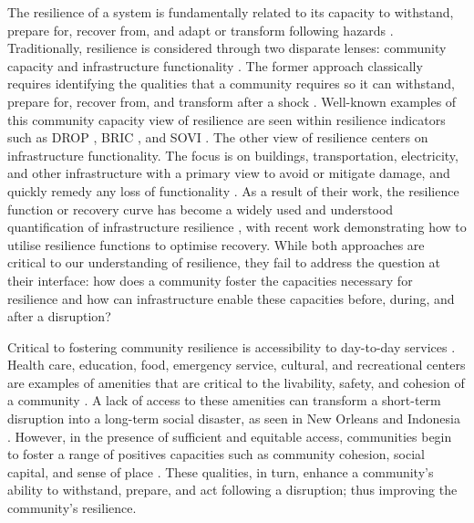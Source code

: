 \documentclass[review,3p,times,onecolumn,sort&compress,12pt]{elsarticle}
\let \cite \parencite
\begin{document}
The resilience of a system is fundamentally related to its capacity to withstand, prepare for, recover from, and adapt or transform following hazards \cite{Bene2012-mx, Meerow2016-definingRes, GillespieMarthaler2019-ak,Cutter2016-xv}.
Traditionally, resilience is considered through two disparate lenses: community capacity \cite{Cutter2014-lr, Zautra2008-nc} and infrastructure functionality \cite{lin2018empirical, Cutter2014-lr}.
The former approach classically requires identifying the qualities that a community requires so it can withstand, prepare for, recover from, and transform after a shock \cite{Cutter2010-ee, Cutter2016-xv, Cutter2014-lr, Sherrieb2010-lk}.
Well-known examples of this community capacity view of resilience are seen within resilience indicators such as DROP \cite{Cutter2008-if}, BRIC \cite{Cutter2014-lr}, and SOVI \cite{Cutter2003-xi}.
The other view of resilience centers on infrastructure functionality.
The focus is on buildings, transportation, electricity, and other infrastructure with a primary view to avoid or mitigate damage, and quickly remedy any loss of functionality \cite{Bruneau2003-lk, Barker2013-uf, Curt2018-mm, Guidotti2016-hc, Hosseini2016-ae, Haimes2009-oi}.
As a result of their work, the resilience function or recovery curve has become a widely used and understood quantification of infrastructure resilience \cite{Bruneau2006-jg, Sharma2018-uh}, with recent work demonstrating how to utilise resilience functions to optimise recovery.
While both approaches are critical to our understanding of resilience, they fail to address the question at their interface: 
how does a community foster the capacities necessary for resilience and how can infrastructure enable these capacities before, during, and after a disruption?

Critical to fostering community resilience is accessibility to day-to-day services \cite{logan2020reframing}.
Health care, education, food, emergency service, cultural, and recreational centers are examples of amenities that are critical to the livability, safety, and cohesion of a community \cite{Contreras2017-wn, Dempsey2011-sv, Talen2003-iy, winter1997coordinating, logan2020reframing, unesco-jn}.
A lack of access to these amenities can transform a short-term disruption into a long-term social disaster, as seen in New Orleans and Indonesia \cite{watt-ht, Netter_2016-zp, Contreras2017-wn}.
However, in the presence of sufficient and equitable access, communities begin to foster a range of positives capacities such as community cohesion, social capital, and sense of place \cite{Jennings2019-jk, Forrest2001-wz}.
These qualities, in turn, enhance a community's ability to withstand, prepare, and act following a disruption; thus improving the community's resilience.
\end{document}
